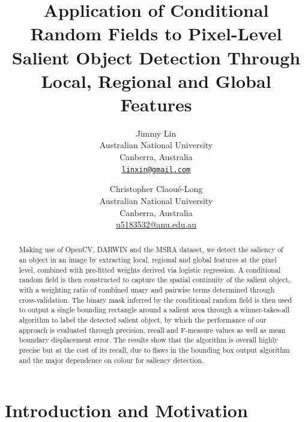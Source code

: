 \documentclass[10pt,twocolumn,letterpaper]{article}
\begin{document}
\title{Application of Conditional Random Fields to Pixel-Level Salient Object Detection Through Local, Regional and Global Features}

\author{Jimmy Lin\\
Australian National University\\
Canberra, Australia\\
{\tt\small \url{linxin@gmail.com}}
\and
Christopher Claou\'e-Long\\
Australian National University\\
Canberra, Australia\\
{\small\url{u5183532@anu.edu.au}}
}

\maketitle

\begin{abstract}
Making use of OpenCV, DARWIN and the MSRA dataset, we detect the saliency of an object in an image by extracting local, regional and global features at the pixel level,  combined with pre-fitted weights derived via logistic regression. A conditional random field is then constructed to capture the spatial continuity of the salient object, with a weighting ratio of combined unary and pairwise terms determined through cross-validation. The binary mask inferred by the conditional random field is then used to output a single bounding rectangle around a salient area through a winner-takes-all algorithm to label the detected salient object, by which the performance of our approach is evaluated through precision, recall and F-measure values as well as mean boundary displacement error. The results show that the algorithm is overall highly precise but at the cost of its recall, due to flaws in the bounding box output algorithm and the major dependence on colour for saliency detection.
\end{abstract}

\section{Introduction and Motivation}
\end{document}
